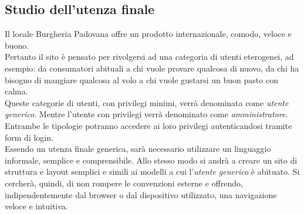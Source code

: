 \subsection{Studio dell'utenza finale}
Il locale Burgheria Padovana offre un prodotto internazionale, comodo, veloce e buono.\\
Pertanto il sito è pensato per rivolgersi ad una categoria di utenti eterogenei, ad esempio: da consumatori abituali a chi vuole provare qualcosa di nuovo, da chi ha bisogno di mangiare qualcosa al volo a chi vuole gustarsi un buon pasto con calma.\\
Queste categorie di utenti, con privilegi minimi, verrà denominata come \emph{utente generico}.
Mentre l'utente con privilegi verrà denominato come \emph{amministratore}.\\ 
Entrambe le tipologie potranno accedere ai loro privilegi autenticandosi tramite form di login.\\
Essendo un utenza finale generica, sarà necessario utilizzare un linguaggio informale, semplice e comprensibile.
Allo stesso modo si andrà a creare un sito di struttura e layout semplici e simili ai modelli a cui l'\emph{utente generico} è abituato.
Si cercherà, quindi, di non rompere le convenzioni esterne e offrendo, indipendentemente dal browser o dal dispositivo utilizzato, una navigazione veloce e intuitiva.\\